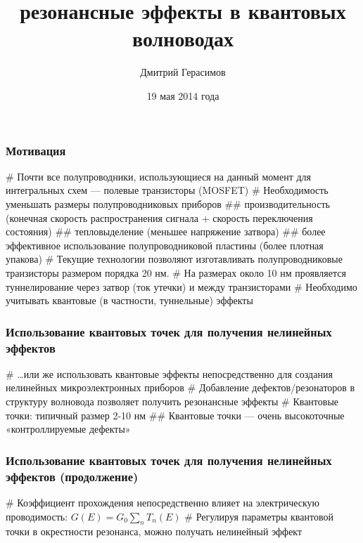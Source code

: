 \documentclass{beamer}
\title[]{\todo{Метод R-матриц и} резонансные эффекты в квантовых волноводах}
\author{Дмитрий Герасимов}
\institute[ИТМО]{Университет ИТМО}
\date{19 мая 2014 года}
\begin{document}
\maketitle

\begin{frame}[fragile]
\frametitle{Мотивация}
\begin{easylist}[itemize]
# Почти все полупроводники, использующиеся на данный момент для интегральных схем — полевые транзисторы (MOSFET)
# Необходимость уменьшать размеры полупроводниковых приборов
## производительность (конечная скорость распространения сигнала + скорость переключения состояния)
## тепловыделение (меньшее напряжение затвора)
## более эффективное использование полупроводниковой пластины (более плотная упакова)
# Текущие технологии позволяют изготавливать полупроводниковые транзисторы размером порядка 20 нм.
# На размерах около 10 нм проявляется туннелирование через затвор (ток утечки) и между транзисторами
# Необходимо учитывать квантовые (в частности, туннельные) эффекты
\end{easylist}
\end{frame}

\begin{frame}[fragile]
\frametitle{Использование квантовых точек для получения нелинейных эффектов}
\begin{easylist}[itemize]
# \dots или же использовать квантовые эффекты непосредственно для создания нелинейных микроэлектронных приборов
# Добавление дефектов/резонаторов в структуру волновода позволяет получить резонансные эффекты
# Квантовые точки: типичный размер 2-10 нм
## Квантовые точки — очень высокоточные «контроллируемые дефекты»
\end{easylist}
\end{frame}

\begin{frame}[fragile]
\frametitle{Использование квантовых точек для получения нелинейных эффектов (продолжение)}
\begin{easylist}[itemize]
# Коэффициент прохождения непосредственно влияет на электрическую проводимость: $G(E) = G_0 \sum\limits_n T_n(E)$
# Регулируя параметры квантовой точки в окрестности резонанса, можно получать нелинейный эффект
\end{easylist}
\end{frame}
\end{document}
